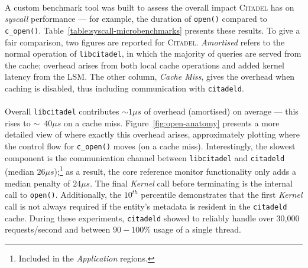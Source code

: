 \paragraph{} A custom benchmark tool was built to assess the overall impact \textsc{Citadel} has on \textit{syscall} performance --- for example, the duration of \texttt{open()} compared to \texttt{c\_open()}. Table~\ref{table:syscall-microbenchmarks} presents these results. To give a fair comparison, two figures are reported for \textsc{Citadel}. \textit{Amortised} refers to the normal operation of \texttt{libcitadel}, in which the majority of queries are served from the cache; overhead arises from both local cache operations and added kernel latency from the LSM. The other column, \textit{Cache Miss}, gives the overhead when caching is disabled, thus including communication with \texttt{citadeld}.

\paragraph{} Overall \texttt{libcitadel} contributes $\sim{}1 \mu s$ of overhead (amortised) on average --- this rises to $\sim$~$40 \mu s$ on a cache miss. Figure~\ref{fig:open-anatomy} presents a more detailed view of where exactly this overhead arises, approximately plotting where the control flow for \texttt{c\_open()} moves (on a cache miss). Interestingly, the slowest component is the communication channel between \texttt{libcitadel} and \texttt{citadeld} (median $26\mu s$);\footnote{Included in the \textit{Application} regions.} as a result, the core reference monitor functionality only adds a median penalty of $24\mu s$. The final \textit{Kernel} call before terminating is the internal call to \texttt{open()}. Additionally, the $10^{th}$ percentile demonstrates that the first \textit{Kernel} call is not always required if the entity's metadata is resident in the \texttt{citadeld} cache. During these experiments, \texttt{citadeld} showed to reliably handle over 30,000 requests/second and between $90-100\%$ usage of a single thread.

